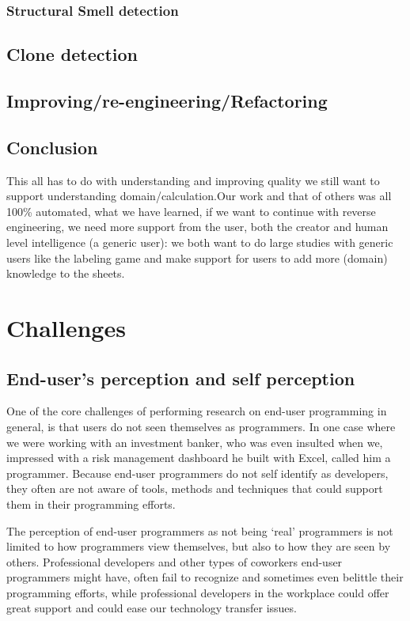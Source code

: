 \documentclass[conference]{IEEEtran}
\begin{document}
\subsubsection{Structural Smell detection}

\subsection{Clone detection}

\subsection{Improving/re-engineering/Refactoring}


\subsection{Conclusion}
This all has to do with understanding and improving quality we still want to support understanding domain/calculation.Our work and that of others was all 100\% automated, what we have learned, if we want to continue with reverse engineering, we need more support from the user, both the creator and human level intelligence (a generic user): we both want to do large studies with generic users like the labeling game and make support for users to add more (domain) knowledge to the sheets.

\section{Challenges} 

\subsection{End-user's perception and self perception}
One of the core challenges of performing research on end-user programming in general, is that users do not seen themselves as programmers.  In one case where we were working with an investment banker, who was even insulted when we, impressed with a risk management dashboard he built with Excel, called him a programmer. Because end-user programmers do not self identify as developers, they often are not aware of tools, methods and techniques that could support them in their programming efforts.

The perception of end-user programmers as not being `real' programmers is not limited to how programmers view themselves, but also to how they are seen by others. Professional developers and other types of coworkers end-user programmers might have, often fail to recognize and sometimes even belittle their programming efforts, while professional developers in the workplace could offer great support and could ease our technology transfer issues.
\end{document}
